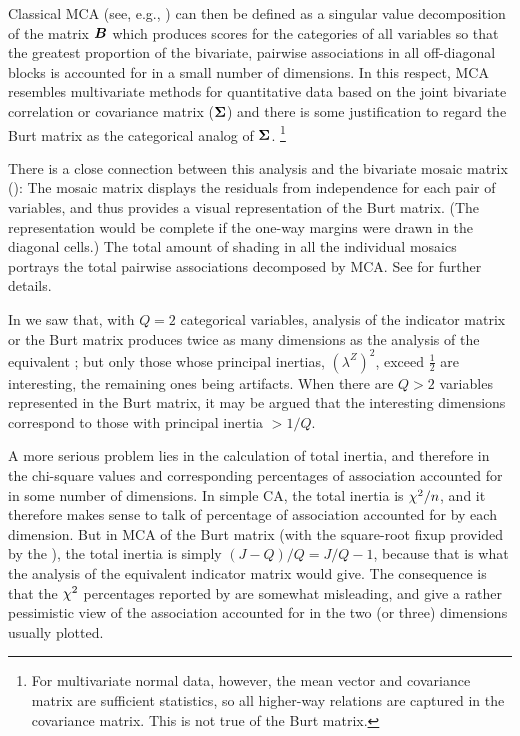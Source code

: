 Classical MCA (see, e.g., \cite{Greenacre:84,GowerHand:96})
can then be defined as a singular value decomposition of the matrix $\bm{B}$ which produces scores for the
categories of all variables so that the greatest proportion of the
bivariate, pairwise associations in all off-diagonal blocks is accounted for in
a small number of dimensions.
In this respect, MCA resembles multivariate methods for quantitative
data based on the joint bivariate correlation or covariance matrix
($\bm{\Sigma}$)
and there is some justification to regard the Burt matrix as the
categorical analog of $\bm{\Sigma}$.%
\footnote{For multivariate normal data, however, the mean vector and
covariance matrix are sufficient statistics, so all higher-way relations
are captured in the covariance matrix.  This is not true of the Burt
matrix.}

There is a close connection between this analysis and the bivariate mosaic
matrix ():
The mosaic matrix displays the residuals from independence for each
pair of variables, and thus provides a visual representation of the Burt matrix.
(The representation would be complete if the one-way margins
were drawn in the diagonal cells.)
The total amount of shading in all the individual mosaics
portrays the total pairwise associations decomposed by MCA.
See \citet{Friendly:99b} for further details.

In  we saw that, with $Q=2$ categorical variables,
analysis of the indicator matrix or the Burt matrix
produces twice as many dimensions as the analysis of the
equivalent \ctab; but only those whose principal inertias,
$(\lambda^Z)^2$, exceed $\frac{1}{2}$
are interesting, the remaining ones being artifacts.
When there are $Q>2$ variables represented in the Burt matrix,
it may be argued \citep{Greenacre:84,Greenacre:90} that the
interesting dimensions correspond to those with principal
inertia $> 1/Q$.

A more serious problem lies in the calculation of total inertia,
and therefore in the chi-square values and corresponding percentages
of association accounted for in some number of dimensions.
In simple CA, the total inertia is $\chi^2 /n$, and it therefore
makes sense to talk of percentage of association accounted for
by each dimension.
But in MCA of
the Burt matrix (with the square-root fixup provided by the ),
the total inertia is simply $(J - Q)/Q = J/Q - 1$,
because that is what the analysis of the equivalent indicator matrix
would give.
The consequence is that the $\chi^2$ percentages reported by
 are somewhat misleading, and give a rather pessimistic
view of the association accounted for in the two (or three) dimensions
usually plotted.

